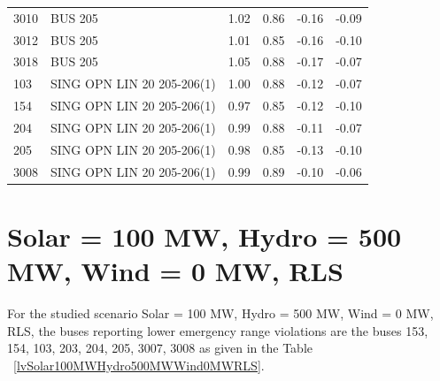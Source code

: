 \documentclass[10pt]{report}
\begin{document}
\begin{table}[H]
{\begin{tabular}{llrrrr}
3010 & BUS 205 & 1.02 & 0.86 & -0.16 & -0.09 \\
3012 & BUS 205 & 1.01 & 0.85 & -0.16 & -0.10 \\
3018 & BUS 205 & 1.05 & 0.88 & -0.17 & -0.07 \\
103 & SING OPN LIN   20 205-206(1) & 1.00 & 0.88 & -0.12 & -0.07 \\
154 & SING OPN LIN   20 205-206(1) & 0.97 & 0.85 & -0.12 & -0.10 \\
204 & SING OPN LIN   20 205-206(1) & 0.99 & 0.88 & -0.11 & -0.07 \\
205 & SING OPN LIN   20 205-206(1) & 0.98 & 0.85 & -0.13 & -0.10 \\
3008 & SING OPN LIN   20 205-206(1) & 0.99 & 0.89 & -0.10 & -0.06 \\
\bottomrule
\end{tabular}}
\end{table}

\section{Solar = 100 MW, Hydro = 500 MW, Wind = 0 MW, RLS}
For the studied scenario Solar = 100 MW, Hydro = 500 MW, Wind = 0 MW, RLS, the buses reporting lower emergency range violations are the buses 153, 154, 103, 203, 204, 205, 3007, 3008 as given in the Table ~\ref{lvSolar100MWHydro500MWWind0MWRLS}.
\begin{table}[H]
\caption{Contingencies reporting bus voltages lower than emergency voltage of 1.1 PU for scenario Solar = 100 MW, Hydro = 500 MW, Wind = 0 MW, RLS}
\label{lvSolar100MWHydro500MWWind0MWRLS}
\centering
{}
\end{table}
\end{document}

